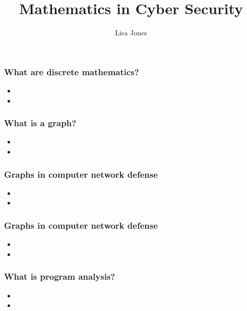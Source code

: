 \documentclass[11pt]{beamer}
\begin{document}
\author{Lisa Jones}
\title{Mathematics in Cyber Security}
\frame[plain]{\maketitle}


\begin{frame}
\frametitle{What are discrete mathematics?}
  \begin{itemize}
  \item{}
    \medskip
  \item{}
  \end{itemize}
\end{frame}



  \begin{frame}
\frametitle{What is a graph?}
  \begin{itemize}
  \item{}
    \medskip
  \item{}
  \end{itemize}
\end{frame}



  \begin{frame}
\frametitle{Graphs in computer network defense}
  \begin{itemize}
  \item{}
    \medskip
  \item{}
  \end{itemize}
  \end{frame}


  \begin{frame}
\frametitle{Graphs in computer network defense}
  \begin{itemize}
  \item{}
    \medskip
  \item{}
      \end{itemize}
  \end{frame}


  \begin{frame}
\frametitle{What is program analysis?}
  \begin{itemize}
  \item{}
    \medskip
  \item{}
      \end{itemize}
  \end{frame}
\end{document}
